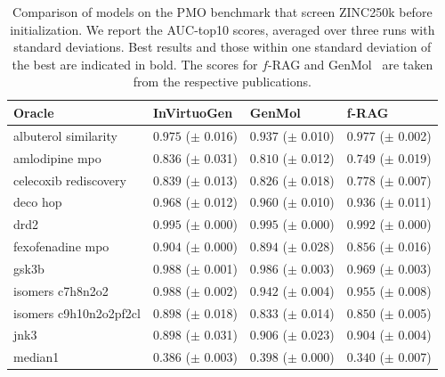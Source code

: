 \documentclass{article} %
\begin{document}
\begin{table}[ht]
\centering
\caption{Comparison of models on the PMO benchmark that screen ZINC250k before initialization. We report the AUC-top10 scores, averaged over three runs with standard deviations. Best results and those within one standard deviation of the best are indicated in bold. The scores for $f$-RAG \citep{lee2024moleculegenerationfragmentretrieval} and GenMol~\citep{genmol} are taken from the respective publications.}
\label{tab:prescreen}
\begin{tabularx}{\linewidth}{l|>{}p{2.2cm} Y Y }
\toprule
Oracle & InVirtuoGen & GenMol & f-RAG \\
\midrule
\small{albuterol similarity} & $\mathbf{0.975}$ {\tiny ($\pm$ 0.016)} & $0.937$ {\tiny ($\pm$ 0.010)} & $\mathbf{0.977}$ {\tiny ($\pm$ 0.002)} \\
\small{amlodipine mpo} & $\mathbf{0.836}$ {\tiny ($\pm$ 0.031)} & $\mathbf{0.810}$ {\tiny ($\pm$ 0.012)} & $0.749$ {\tiny ($\pm$ 0.019)} \\
\small{celecoxib rediscovery} & $\mathbf{0.839}$ {\tiny ($\pm$ 0.013)} & $0.826$ {\tiny ($\pm$ 0.018)} & $0.778$ {\tiny ($\pm$ 0.007)} \\
\small{deco hop} & $\mathbf{0.968}$ {\tiny ($\pm$ 0.012)} & $\mathbf{0.960}$ {\tiny ($\pm$ 0.010)} & $0.936$ {\tiny ($\pm$ 0.011)} \\
\small{drd2} & $\mathbf{0.995}$ {\tiny ($\pm$ 0.000)} & $\mathbf{0.995}$ {\tiny ($\pm$ 0.000)} & $0.992$ {\tiny ($\pm$ 0.000)} \\
\small{fexofenadine mpo} & $\mathbf{0.904}$ {\tiny ($\pm$ 0.000)} & $0.894$ {\tiny ($\pm$ 0.028)} & $0.856$ {\tiny ($\pm$ 0.016)} \\
\small{gsk3b} & $\mathbf{0.988}$ {\tiny ($\pm$ 0.001)} & $0.986$ {\tiny ($\pm$ 0.003)} & $0.969$ {\tiny ($\pm$ 0.003)} \\
\small{isomers c7h8n2o2} & $\mathbf{0.988}$ {\tiny ($\pm$ 0.002)} & $0.942$ {\tiny ($\pm$ 0.004)} & $0.955$ {\tiny ($\pm$ 0.008)} \\
\small{isomers c9h10n2o2pf2cl} & $\mathbf{0.898}$ {\tiny ($\pm$ 0.018)} & $0.833$ {\tiny ($\pm$ 0.014)} & $0.850$ {\tiny ($\pm$ 0.005)} \\
\small{jnk3} & $\mathbf{0.898}$ {\tiny ($\pm$ 0.031)} & $\mathbf{0.906}$ {\tiny ($\pm$ 0.023)} & $\mathbf{0.904}$ {\tiny ($\pm$ 0.004)} \\
\small{median1} & $0.386$ {\tiny ($\pm$ 0.003)} & $\mathbf{0.398}$ {\tiny ($\pm$ 0.000)} & $0.340$ {\tiny ($\pm$ 0.007)} \\

\end{tabularx}
\end{table}
\end{document}
